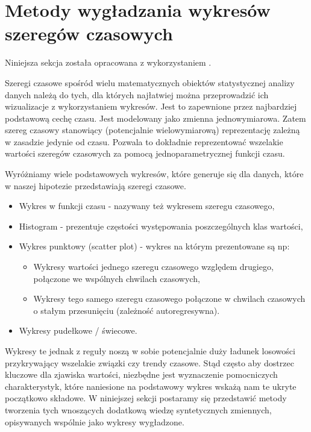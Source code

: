 \documentclass[10pt,a4paper]{book}
\begin{document}
\chapter{Metody wygładzania wykresów szeregów czasowych}

Niniejsza sekcja została opracowana z wykorzystaniem \citep{montgomery2015introduction}.

Szeregi czasowe spośród wielu matematycznych obiektów statystycznej analizy danych należą do tych, dla których najłatwiej można przeprowadzić ich wizualizacje z wykorzystaniem wykresów. Jest to zapewnione przez najbardziej podstawową cechę czasu. Jest modelowany jako zmienna jednowymiarowa. Zatem szereg czasowy stanowiący (potencjalnie wielowymiarową) reprezentację zależną w zasadzie jedynie od czasu. Pozwala to dokładnie reprezentować wszelakie wartości szeregów czasowych za pomocą jednoparametrycznej funkcji czasu. 

Wyróżniamy wiele podstawowych wykresów, które generuje się dla danych, które w naszej hipotezie przedstawiają szeregi czasowe.
\begin{itemize}
\item Wykres w funkcji czasu - nazywany też wykresem szeregu czasowego,
\item Histogram - prezentuje częstości występowania poszczególnych klas wartości,
\item Wykres punktowy (scatter plot) - wykres na którym prezentowane są np:
\begin{itemize}
\item Wykresy wartości jednego szeregu czasowego względem drugiego, połączone we wspólnych chwilach czasowych,
\item Wykresy tego samego szeregu czasowego połączone w chwilach czasowych o stałym przesunięciu (zależność autoregresywna).
\end{itemize}
\item Wykresy pudełkowe / świecowe.
\end{itemize}

Wykresy te jednak z reguły noszą w sobie potencjalnie duży ładunek losowości przykrywający wszelakie związki czy trendy czasowe. Stąd często aby dostrzec kluczowe dla zjawiska wartości, niezbędne jest wyznaczenie pomocniczych charakterystyk, które naniesione na podstawowy wykres wskażą nam te ukryte początkowo składowe. W niniejszej sekcji postaramy się przedstawić metody tworzenia tych wnoszących dodatkową wiedzę syntetycznych zmiennych, opisywanych wspólnie jako wykresy wygładzone.
\end{document}
